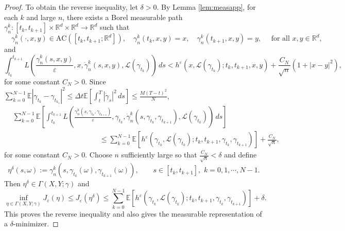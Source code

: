 \documentclass[10pt,a4paper]{amsart}
\newcommand{\R}{\mathbb{R}} %
\newcommand{\e}{\varepsilon}
\newcommand{\ep}{\varepsilon}
\begin{document}
\begin{proof}
To obtain the reverse inequality, let $\delta>0$.
By Lemma \ref{lem:measapp}, for each $k$ and large $n$, there exists a Borel measurable path $\gamma_n^k:[t_k,t_{k+1}] \times \mathbb{R}^d \times \mathbb{R}^d \to \mathbb{R}^d$ such that
\[
\quad \gamma_n^k(\cdot, x,y) \in \mathrm{AC}([t_k, t_{k+1};\R^d]), \quad \gamma_n^k(t_k,x,y)=x, \quad \gamma_n^k(t_{k+1},x,y)=y,\quad \text{ for all }x, y\in \mathbb{R}^d,
\]
and
\[
\int_{t_k}^{t_{k+1}}
L \left(\frac{\gamma_n^k(s,x,y)}{\e}, x, \dot{\gamma}_n^k(s,x,y),\mathcal{L}(\gamma_{t_k})\right)\,ds
<
h^\e\left(x,\mathcal{L}(\gamma_{t_k});t_k, t_{k+1}, x, y\right)+\frac{C_N}{\sqrt{n}}\left(1+|x-y|^2\right),
\]
for some constant $C_N>0$. Since $ \sum_{k=0}^{N-1}\mathbb{E}\left|\gamma_{t_k}-\gamma_{t_{k_1}}\right|^2 \leq \Delta t \mathbb{E} \left[\int_t^T\left|\dot{\gamma}_s\right|^2 \, ds\right]\leq \frac{M(T-t)^2}{N}$,
\begin{equation}\label{eqn:gamm}
\begin{aligned}
&\sum_{k=0}^{N-1}\mathbb{E}\left[\int_{t_k}^{t_{k+1}}
L \left(\frac{\gamma_n^k(s,\gamma_{t_k},\gamma_{t_{k+1}})}{\varepsilon}, \gamma_{t_k}, \dot{\gamma}_n^k(s,\gamma_{t_k},\gamma_{t_{k+1}}),\mathcal{L}(\gamma_{t_k})\right)\,ds\right]\\
& \qquad \qquad \qquad\qquad\qquad\qquad\leq
\sum_{k=0}^{N-1}\mathbb{E} \left[h^\varepsilon\left(\gamma_{t_k},\mathcal{L}(\gamma_{t_k});t_k, t_{k+1}, \gamma_{t_k}, \gamma_{t_{k+1}}\right)\right]+\frac{C_N}{\sqrt{n}},
\end{aligned}
\end{equation}
for some constant $C_N>0$. Choose $n$ sufficiently large so that $\frac{C_N}{ \sqrt{n}} <\delta$ and define
\[
\eta^\delta(s, \omega):=
\gamma^k_n\left(s,\gamma_{t_k}(\omega),\gamma_{t_{k+1}}(\omega)\right),
\qquad s\in[t_k,t_{k+1}], \,\, k=0,1, \cdots, N-1.
\]
Then $\eta^\delta\in\Gamma(X,Y;\gamma)$ and
\[
\inf_{\eta\in\Gamma(X,Y;\gamma)}
J_\e(\eta) \leq J_\ep(\eta^\delta) \leq \sum_{k=0}^{N-1}\mathbb{E} \left[h^\varepsilon\left(\gamma_{t_k},\mathcal{L}(\gamma_{t_k});t_k, t_{k+1}, \gamma_{t_k}, \gamma_{t_{k+1}}\right)\right]+\delta.
\]
This proves the reverse inequality and also gives the measurable representation of a $\delta$-minimizer.




\end{proof}
\end{document}
